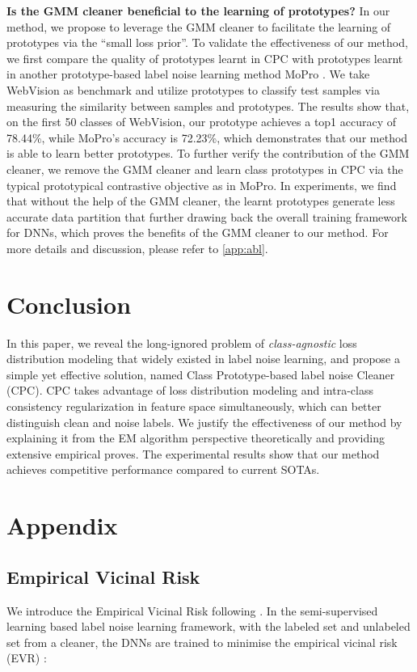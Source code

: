 \documentclass{article} \usepackage{iclr2023_conference,times}
\begin{document}
\textbf{Is the GMM cleaner beneficial to the learning of prototypes?}
In our method, we propose to leverage the GMM cleaner to facilitate the learning of prototypes via the ``small loss prior''. To validate the effectiveness of our method, we first compare the quality of prototypes learnt in CPC with prototypes learnt in another prototype-based label noise learning method MoPro \citep{li2020mopro}. We take WebVision as benchmark and utilize prototypes to classify test samples via measuring the similarity between samples and prototypes. The results show that, on the first 50 classes of WebVision, our prototype achieves a top1 accuracy of 78.44\%, while MoPro's accuracy is 72.23\%, which demonstrates that our method is able to learn better prototypes.
To further verify the contribution of the GMM cleaner, we remove the GMM cleaner and learn class prototypes in CPC via the typical prototypical contrastive objective as in MoPro. In experiments, we find that without the help of the GMM cleaner, the learnt prototypes generate less accurate data partition that further drawing back the overall training framework for DNNs, which proves the benefits of the GMM cleaner to our method. For more details and discussion, please refer to \ref{app:abl}.





\section{Conclusion}
In this paper, we reveal the long-ignored problem of \emph{class-agnostic} loss distribution modeling that widely existed in label noise learning, and propose a simple yet effective solution, named  Class Prototype-based label noise Cleaner (CPC). CPC takes advantage of loss distribution modeling and intra-class consistency regularization in feature space simultaneously, which can  better distinguish clean and noise labels. We  justify the effectiveness of our method by explaining it from the EM algorithm perspective theoretically and providing extensive empirical proves. The experimental results show that our method achieves competitive performance compared to current SOTAs. 





\appendix
\section{Appendix}
\subsection{Empirical Vicinal Risk} \label{app:evr}
We introduce the Empirical Vicinal Risk following \citet{cordeiro2022longremix}. In the semi-supervised learning based label noise learning framework, with the labeled set  and unlabeled set  from a cleaner, the DNNs are trained to minimise the empirical vicinal risk (EVR) \citep{zhang2017mixup}:
\end{document}
